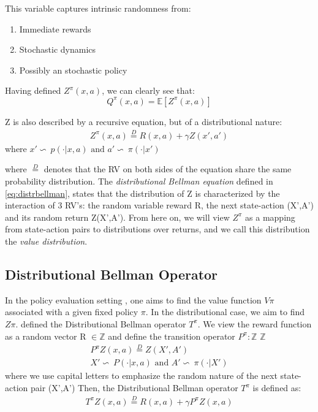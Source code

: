 This variable captures intrinsic randomness from:
\begin{enumerate}
    \item Immediate rewards
    \item Stochastic dynamics
    \item Possibly an stochastic policy
\end{enumerate}

Having defined $Z^\pi(x,a)$, we can clearly see that:
\begin{equation}
    Q^\pi(x,a) = \mathbb E[Z^\pi(x,a)]
\end{equation}

Z is also described by a recursive equation, but of a distributional nature:
\begin{eqnarray}
    Z^\pi(x,a) \stackrel{D}{=} R(x,a) + \gamma Z(x',a') \label{eq:distrbellman}
\end{eqnarray}
where $x'\backsim\ p(\cdot|x,a) \text{ and } a' \backsim\ \pi(\cdot |x')$

where $\stackrel{D}{=}$ denotes that the RV on both sides of the equation share the same
 probability distribution.
The \textit{distributional Bellman equation} defined in \eqref{eq:distrbellman}, states
that the distribution of 
Z is characterized by the interaction of 3 RV's: the random variable reward R, the next
state-action (X',A')
and its random return 
Z(X',A'). From here on, we will view $Z^\pi$ as a mapping from state-action pairs to
distributions over
returns, and we call this distribution the \textit{value distribution}.

\subsection{Distributional Bellman Operator}

In the policy evaluation setting \cite{Sutton1998}, one aims to find the value function
$V\pi$ associated
with a given fixed policy $\pi$. In the distributional case, we aim to find $Z\pi$.
\cite{Bellemare2017} defined the Distributional Bellman operator $T^\pi$.
We view the reward function as a random vector R $\in \mathbb{Z}$ and define the transition
operator 
$P^\pi: \mathbb{Z} $ \ra $\mathbb{Z}$
\begin{eqnarray}
    P^\pi Z(x,a) \stackrel{D}{=} Z(X',A')\\
    X'\backsim\ P(\cdot|x,a) \text{ and } A' \backsim\ \pi(\cdot |X')
\end{eqnarray}
where we use capital letters to emphasize the random nature of the next state-action pair
 (X',A')
Then, the Distributional Bellman operator $T^\pi$ is defined as:
\begin{eqnarray}
    T^\pi Z(x,a) \stackrel{D}{=} R(x,a) + \gamma P^\pi Z(x,a) \label{eq:distrbellmanoperator}
\end{eqnarray}


